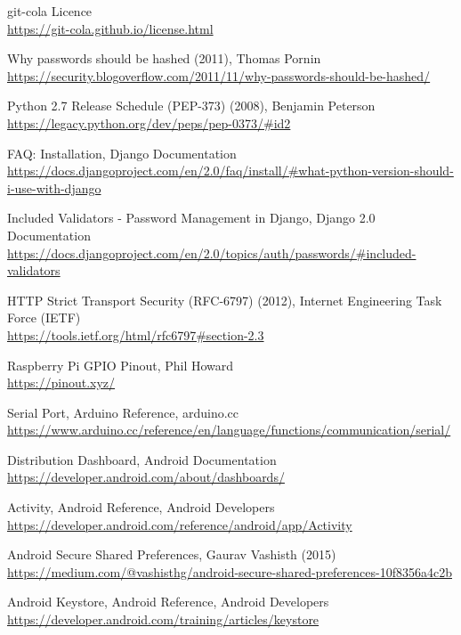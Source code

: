 \begin{thebibliography}{99}
git-cola Licence\\
\url{https://git-cola.github.io/license.html}

Why passwords should be hashed (2011), Thomas Pornin\\
\url{https://security.blogoverflow.com/2011/11/why-passwords-should-be-hashed/}

Python 2.7 Release Schedule (PEP-373) (2008), Benjamin Peterson\\
\url{https://legacy.python.org/dev/peps/pep-0373/#id2}

FAQ: Installation, Django Documentation\\
\url{https://docs.djangoproject.com/en/2.0/faq/install/#what-python-version-should-i-use-with-django}

Included Validators - Password Management in Django, Django 2.0 Documentation\\
\url{https://docs.djangoproject.com/en/2.0/topics/auth/passwords/#included-validators}

HTTP Strict Transport Security (RFC-6797) (2012), Internet Engineering Task Force (IETF)\\
\url{https://tools.ietf.org/html/rfc6797#section-2.3}

Raspberry Pi GPIO Pinout, Phil Howard\\
\url{https://pinout.xyz/}

Serial Port, Arduino Reference, arduino.cc\\
\url{https://www.arduino.cc/reference/en/language/functions/communication/serial/}

Distribution Dashboard, Android Documentation\\
\url{https://developer.android.com/about/dashboards/}

Activity, Android Reference, Android Developers\\
\url{https://developer.android.com/reference/android/app/Activity}

Android Secure Shared Preferences, Gaurav Vashisth (2015)\\
\url{https://medium.com/@vashisthg/android-secure-shared-preferences-10f8356a4c2b}

Android Keystore, Android Reference, Android Developers\\
\url{https://developer.android.com/training/articles/keystore}


\end{thebibliography}
